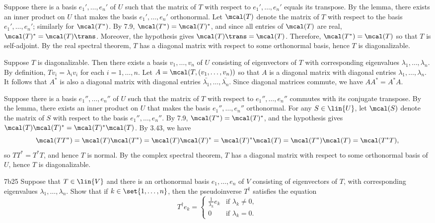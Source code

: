\begin{sol}
\begin{subexercises}
        \leftimp Suppose there is a basis $e_1', \ldots, e_n'$ of $U$ such that the matrix of $T$ with respect to $e_1', \ldots, e_n'$ equals its transpose.
        By the lemma, there exists an inner product on $U$ that makes the basis $e_1', \ldots, e_n'$ orthonormal.
        Let $\mcal(T)$ denote the matrix of $T$ with respect to the basis $e_1', \ldots, e_n'$; similarly for $\mcal(T^\ast)$.
        By 7.9, $\mcal(T^\ast) = \mcal(T)^\ast$, and since all entries of $\mcal(T)$ are real, $\mcal(T)^\ast = \mcal(T)\trans$.
        Moreover, the hypothesis gives $\mcal(T)\trans = \mcal(T)$.
        Therefore, $\mcal(T^\ast) = \mcal(T)$ so that $T$ is self-adjoint.
        By the real spectral theorem, $T$ has a diagonal matrix with respect to some orthonormal basis, hence $T$ is diagonalizable.
        \item \rightimp Suppose $T$ is diagonalizable.
        Then there exists a basis $v_1, \ldots, v_n$ of $U$ consisting of eigenvectors of $T$ with corresponding eigenvalues $\lambda_1, \ldots, \lambda_n$.
        By definition, $Tv_i = \lambda_i v_i$ for each $i = 1, \ldots, n$.
        Let $A = \mcal(T, (v_1, \ldots, v_n))$ so that $A$ is a diagonal matrix with diagonal entries $\lambda_1, \ldots, \lambda_n$.
        It follows that $A^\ast$ is also a diagonal matrix with diagonal entries $\bar{\lambda_1}, \ldots, \bar{\lambda_n}$.
        Since diagonal matrices commute, we have $AA^\ast = A^\ast A$.

        \leftimp Suppose there is a basis $e_1'', \ldots, e_n''$ of $U$ such that the matrix of $T$ with respect to $e_1'', \ldots, e_n''$ commutes with its conjugate transpose.
        By the lemma, there exists an inner product on $U$ that makes the basis $e_1'', \ldots, e_n''$ orthonormal.
        For any $S \in \lin{U}$, let $\mcal(S)$ denote the matrix of $S$ with respect to the basis $e_1'', \ldots, e_n''$.
        By 7.9, $\mcal(T^\ast) = \mcal(T)^\ast$, and the hypothesis gives $\mcal(T)\mcal(T)^\ast = \mcal(T)^\ast \mcal(T)$.
        By 3.43, we have
        \[
            \mcal(TT^\ast) = \mcal(T) \mcal(T^\ast) = \mcal(T) \mcal(T)^\ast = \mcal(T)^\ast \mcal(T) = \mcal(T^\ast) \mcal(T) = \mcal(T^\ast T),
        \]
        so $TT^\ast = T^\ast T$, and hence $T$ is normal.
        By the complex spectral theorem, $T$ has a diagonal matrix with respect to some orthonormal basis of $U$, hence $T$ is diagonalizable. \qedhere
    \end{subexercises}
\end{sol}

\begin{exercise}{7b25}
    Suppose that $T \in \lin{V}$ and there is an orthonormal basis $e_1, \ldots, e_n$ of $V$ consisting of eigenvectors of $T$, with corresponding eigenvalues $\lambda_1, \ldots, \lambda_n$.
    Show that if $k \in \set{1, \ldots, n}$, then the pseudoinverse $T^\dagger$ satisfies the equation
    \[
        T^\dagger e_k = \begin{cases}
            \frac{1}{\lambda_k} e_k & \text{if } \lambda_k \neq 0, \\
            0 & \text{if } \lambda_k = 0.
        \end{cases}
    \]
\end{exercise}

